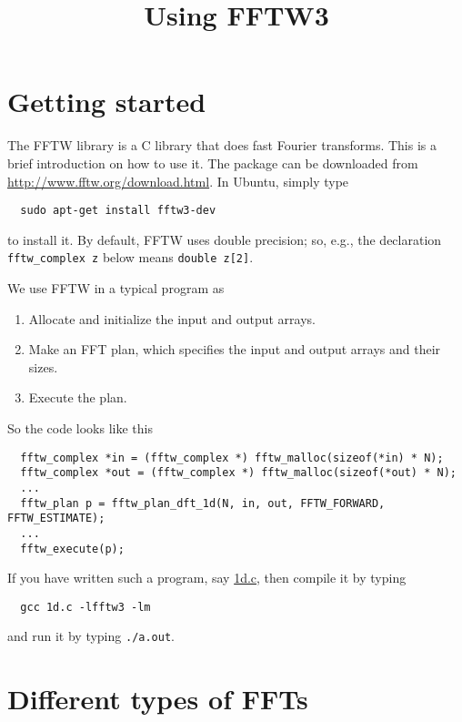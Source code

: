 \documentclass[12pt]{article}
\begin{document}
\title{Using FFTW3}
\date{}
\maketitle





\tableofcontents




\section{Getting started}

The FFTW library is a C library that does fast Fourier transforms.
%
This is a brief introduction on how to use it.
%
The package can be downloaded from \url{http://www.fftw.org/download.html}.
%
In Ubuntu, simply type
\begin{verbatim}
  sudo apt-get install fftw3-dev
\end{verbatim}
to install it.
%
By default, FFTW uses double precision;
so, e.g., the declaration
\texttt{fftw\_complex z} below means \texttt{double z[2]}.



We use FFTW in a typical program as
%
\begin{enumerate}
  \item Allocate and initialize the input and output arrays.
  \item Make an FFT plan, which specifies the input and output arrays and their sizes.
  \item Execute the plan.
\end{enumerate}

So the code looks like this
{\footnotesize
\begin{verbatim}
  fftw_complex *in = (fftw_complex *) fftw_malloc(sizeof(*in) * N);
  fftw_complex *out = (fftw_complex *) fftw_malloc(sizeof(*out) * N);
  ...
  fftw_plan p = fftw_plan_dft_1d(N, in, out, FFTW_FORWARD, FFTW_ESTIMATE);
  ...
  fftw_execute(p);
\end{verbatim}
}

If you have written such a program, say \url{1d.c},
then compile it by typing
\begin{verbatim}
  gcc 1d.c -lfftw3 -lm
\end{verbatim}
and run it by typing \texttt{./a.out}.
%




\section{Different types of FFTs}
\end{document}

